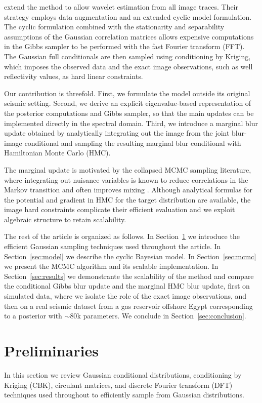 \documentclass[12pt]{article}
\begin{document}
\citet{Senn2025} extend the method to allow wavelet estimation from all image traces. Their strategy employs data augmentation and an extended cyclic model formulation. The cyclic formulation combined with the stationarity and separability assumptions of the Gaussian correlation matrices allows expensive computations in the Gibbs sampler to be performed with the fast Fourier transform (FFT).
The Gaussian full conditionals are then sampled using conditioning by Kriging, which imposes the observed data and the exact image observations, such as well reflectivity values, as hard linear constraints.

Our contribution is threefold. First, we formulate the model outside its original seismic setting.
Second, we derive an explicit eigenvalue-based representation of the posterior computations and Gibbs sampler, so that the main updates can be implemented directly in the spectral domain. 
Third, we introduce a marginal blur update obtained by analytically integrating out the image from the joint blur-image conditional and sampling the resulting marginal blur conditional with Hamiltonian Monte Carlo (HMC). 

The marginal update is motivated by the collapsed MCMC sampling literature, where integrating out nuisance variables is known to reduce correlations in the Markov transition and often improves mixing \citep{Liu2008}. Although analytical formulas for the potential and gradient in HMC for the target distribution are available, the image hard constraints complicate their efficient evaluation and we exploit algebraic structure to retain scalability.

The rest of the article is organized as follows. In Section~\ref{sec:preliminaries} we introduce the efficient Gaussian sampling techniques used throughout the article. In Section~\ref{sec:model} we describe the cyclic Bayesian model. In Section~\ref{sec:mcmc} we present the MCMC algorithm and its scalable implementation. 
In Section~\ref{sec:results} we demonstrante the scalability of the method and compare the conditional Gibbs blur update and the marginal HMC blur update, first on simulated data, where we isolate the role of the exact image observations, and then on a real seismic dataset from a gas reservoir offshore Egypt corresponding to a posterior with $\sim 80$k parameters.
We conclude in Section~\ref{sec:conclusion}.


\section{Preliminaries} \label{sec:preliminaries}
In this section we review Gaussian conditional distributions, conditioning by Kriging (CBK), circulant matrices, and discrete Fourier transform (DFT) techniques used throughout to efficiently sample from Gaussian distributions.
\end{document}
